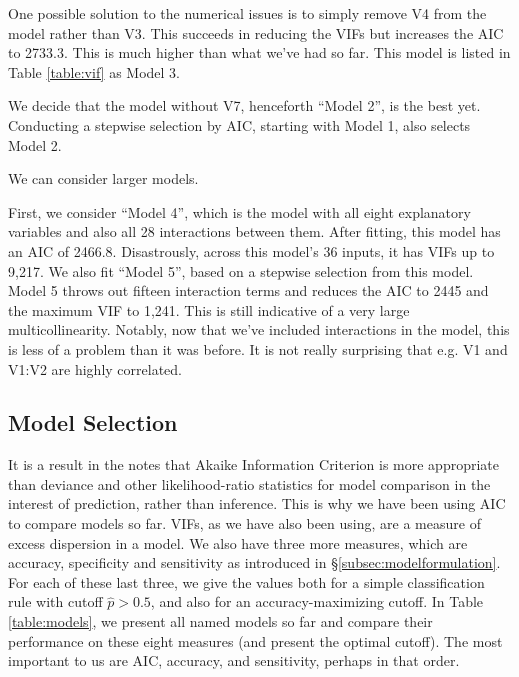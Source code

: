 \documentclass[11pt, oneside]{article}
\begin{document}
One possible solution to the numerical issues is to simply remove V4 from the model rather than V3. This succeeds in reducing the VIFs but increases the AIC to 2733.3. This is much higher than what we've had so far. This model is listed in Table \ref{table:vif} as Model 3. 

We decide that the model without V7, henceforth ``Model 2'', is the best yet. Conducting a stepwise selection by AIC, starting with Model 1, also selects Model 2. 

We can consider larger models. 

First, we consider ``Model 4'', which is the model with all eight explanatory variables and also all 28 interactions between them. After fitting, this model has an AIC of 2466.8. Disastrously, across this model's 36 inputs, it has VIFs up to 9,217. We also fit ``Model 5'', based on a stepwise selection from this model. Model 5 throws out fifteen interaction terms and reduces the AIC to 2445 and the maximum VIF to 1,241. This is still indicative of a very large multicollinearity. Notably, now that we've included interactions in the model, this is less of a problem than it was before. It is not really surprising that e.g. V1 and V1:V2 are highly correlated. 

\subsection{Model Selection}

It is a result in the notes that Akaike Information Criterion is more appropriate than deviance and other likelihood-ratio statistics for model comparison in the interest of prediction, rather than inference. This is why we have been using AIC to compare models so far. VIFs, as we have also been using, are a measure of excess dispersion in a model. We also have three more measures, which are accuracy, specificity and sensitivity as introduced in \S\ref{subsec:modelformulation}. For each of these last three, we give the values both for a simple classification rule with cutoff $\hat{p} > 0.5$, and also for an accuracy-maximizing cutoff. In Table \ref{table:models}, we present all named models so far and compare their performance on these eight measures (and present the optimal cutoff). The most important to us are AIC, accuracy, and sensitivity, perhaps in that order. 
\end{document}
